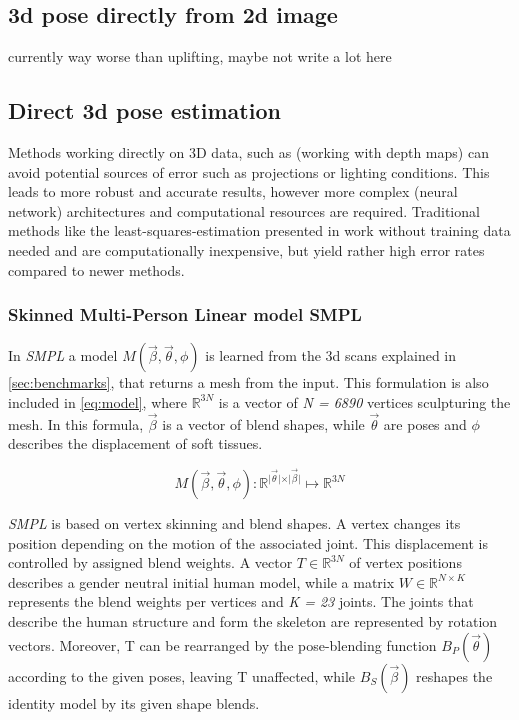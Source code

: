 \subsection{3d pose directly from 2d image}
currently way worse than uplifting, maybe not write a lot here
\subsection{Direct 3d pose estimation}
Methods working directly on 3D data, such as \cite{Ye2011} (working with depth maps) can avoid potential sources of error such as projections or lighting conditions. This leads to more robust and accurate results, however more complex (neural network) architectures and computational resources are required. Traditional methods like the least-squares-estimation presented in \cite{Haralick98} work without training data needed and are computationally inexpensive, but yield rather high error rates compared to newer methods.

\subsubsection{Skinned Multi-Person Linear model SMPL}
In \emph{SMPL} a model $M(\vec{\beta},\vec{\theta},\phi)$ is learned from the 3d scans explained in \autoref{sec:benchmarks}, that returns a mesh from the input. This formulation is also included in \autoref{eq:model}, where $\mathbb{R}^{3N}$ is a vector of \emph{N = 6890} vertices sculpturing the mesh. In this formula, $\vec{\beta}$ is a vector of blend shapes, while $\vec{\theta}$ are poses and $\phi$ describes the displacement of soft tissues.

\begin{equation}
\label{eq:model}
M(\vec{\beta},\vec{\theta},\phi) : \mathbb{R}^{\vert \vec{\theta} \vert \times \vert \vec{\beta} \vert} \mapsto \mathbb{R}^{3N}
\end{equation}

\emph{SMPL} is based on vertex skinning and blend shapes. A vertex changes its position depending on the motion of the associated joint. This displacement is controlled by assigned blend weights. A vector $T \in \mathbb{R}^{3N}$ of vertex positions describes a gender neutral initial human model, while a matrix $W \in \mathbb{R}^{N \times K}$ represents the blend weights per vertices and \emph{K = 23} joints. The joints that describe the human structure and form the skeleton are represented by rotation vectors. Moreover, T can be rearranged by the pose-blending function $B_{P}(\vec{\theta})$ according to the given poses, leaving T unaffected, while $B_{S}(\vec{\beta})$ reshapes the identity model by its given shape blends.

\cite{smpl}


